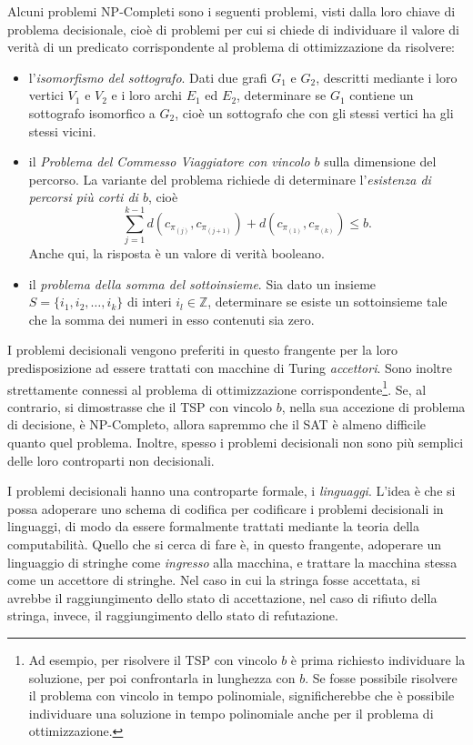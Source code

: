 \documentclass[10pt]{\classname}
\theoremstyle{newlinethm}
\theoremstyle{theorem}
\theoremstyle{definition}
\theoremstyle{definition}
\theoremstyle{definition}
\theoremstyle{definition}
\begin{document}
Alcuni problemi NP-Completi sono i seguenti problemi, visti dalla loro chiave di problema decisionale, cioè di problemi per cui si chiede di individuare il valore di verità di un predicato corrispondente al problema di ottimizzazione da risolvere:
\begin{itemize}
    \item l'\emph{isomorfismo del sottografo}. Dati due grafi $G_1$ e $G_2$, descritti mediante i loro vertici $V_1$ e $V_2$ e i loro archi $E_1$ ed $E_2$, determinare se $G_1$ contiene un sottografo isomorfico a $G_2$, cioè un sottografo che con gli stessi vertici ha gli stessi vicini.
    \item il \emph{Problema del Commesso Viaggiatore con vincolo $b$} sulla dimensione del percorso. La variante del problema richiede di determinare l'\emph{esistenza di percorsi più corti di $b$}, cioè \[\sum_{j=1}^{k-1} d(c_{\pi_{(j)}}, c_{\pi_{(j+1)}}) + d(c_{\pi_{(1)}},c_{\pi_{(k)}}) \leq b.\] Anche qui, la risposta è un valore di verità booleano.
    \item il \emph{problema della somma del sottoinsieme}. Sia dato un insieme $S=\{i_1, i_2, \dots, i_k\}$ di interi $i_l \in \mathbb{Z}$, determinare se esiste un sottoinsieme tale che la somma dei numeri in esso contenuti sia zero.
\end{itemize}
I problemi decisionali vengono preferiti in questo frangente per la loro predisposizione ad essere trattati con macchine di Turing \emph{accettori}. Sono inoltre strettamente connessi al problema di ottimizzazione corrispondente\footnote{Ad esempio, per risolvere il TSP con vincolo $b$ è prima richiesto individuare la soluzione, per poi confrontarla in lunghezza con $b$. Se fosse possibile risolvere il problema con vincolo in tempo polinomiale, significherebbe che è possibile individuare una soluzione in tempo polinomiale anche per il problema di ottimizzazione.}. Se, al contrario, si dimostrasse che il TSP con vincolo $b$, nella sua accezione di problema di decisione, è NP-Completo, allora sapremmo che il SAT è almeno difficile quanto quel problema. Inoltre, spesso i problemi decisionali non sono più semplici delle loro controparti non decisionali.

I problemi decisionali hanno una controparte formale, i \emph{linguaggi}. L'idea è che si possa adoperare uno schema di codifica per codificare i problemi decisionali in linguaggi, di modo da essere formalmente trattati mediante la teoria della computabilità. Quello che si cerca di fare è, in questo frangente, adoperare un linguaggio di stringhe come \emph{ingresso} alla macchina, e trattare la macchina stessa come un accettore di stringhe. Nel caso in cui la stringa fosse accettata, si avrebbe il raggiungimento dello stato di accettazione, nel caso di rifiuto della stringa, invece, il raggiungimento dello stato di refutazione.
\end{document}
